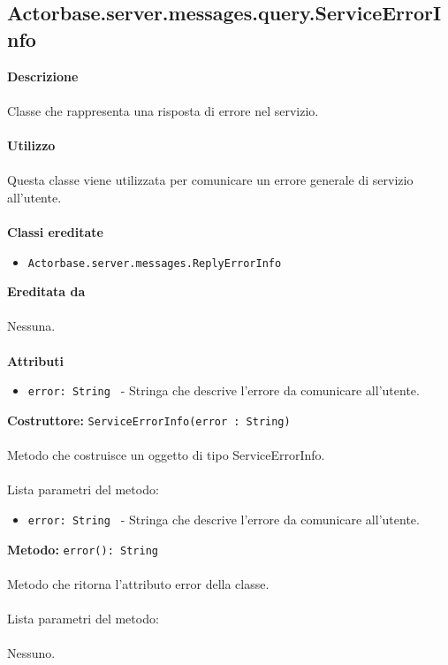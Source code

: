 \documentclass[a4paper]{article}
\begin{document}
	\subsection{Actorbase.server.messages.query.ServiceErrorInfo}
		\textbf{Descrizione}
			\\ \\
			Classe che rappresenta una risposta di errore nel servizio.
			\\ \\
		\textbf{Utilizzo}
			\\ \\
			Questa classe viene utilizzata per comunicare un errore generale di servizio all'utente.
			\\ \\
		\textbf{Classi ereditate}
			\begin{itemize}
				\item \texttt{Actorbase.server.messages.ReplyErrorInfo }
			\end{itemize}
		\textbf{Ereditata da}
			\\ \\
			Nessuna.
			\\ \\
		\textbf{Attributi}
			\begin{itemize}
				\item \texttt{error: String } - Stringa che descrive l'errore da comunicare all'utente.
			\end{itemize}
		\textbf{Costruttore: } \texttt{ServiceErrorInfo(error : String)}
			\\ \\
		Metodo che costruisce un oggetto di tipo ServiceErrorInfo.
			\\ \\
		Lista parametri del metodo:
			\begin{itemize}
				\item \texttt{error: String } - Stringa che descrive l'errore da comunicare all'utente.
			\end{itemize}
		\textbf{Metodo: } \texttt{error(): String}
			\\ \\
		Metodo che ritorna l'attributo error della classe.
			\\ \\
		Lista parametri del metodo:
			\\ \\
			Nessuno.
			
\end{document}
